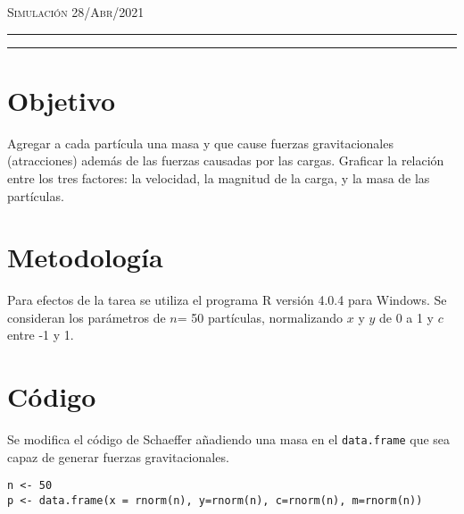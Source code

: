 \documentclass[12pt]{amsart}
\begin{document}
\pagestyle{empty}



\thispagestyle{empty}

{\scshape Simulación} \hfill  \hfill  {\scshape 28/Abr/2021}

\begin{center}
\end{center}
\begin{center}
    \maketitle\author{C. María Montemayor Palos}
\end{center}
\maketitle

\hrule
\hrule
\bigskip
\section{Objetivo}
Agregar a cada partícula una masa y que cause fuerzas gravitacionales (atracciones) además de las fuerzas causadas por las cargas. Graficar la relación entre los tres factores: la velocidad, la magnitud de la carga, y la masa de las partículas.


\section{Metodología}
Para efectos de la tarea \cite{dra} se utiliza el programa R versión 4.0.4 \cite{R} para Windows. Se consideran los parámetros de $n$= 50 partículas, normalizando $x$ y $y$ de 0 a 1 y $c$ entre -1 y 1.

\section{Código}
Se modifica el código de Schaeffer \cite{codigo} añadiendo una masa en el \texttt{data.frame} que sea capaz de generar fuerzas gravitacionales.
\renewcommand{\listingscaption}{Código}
\begin{listing}[H]
  \begin{verbatim}
n <- 50
p <- data.frame(x = rnorm(n), y=rnorm(n), c=rnorm(n), m=rnorm(n))
  \end{verbatim}
  \label{codigo1}
\end{listing}
\end{document}
